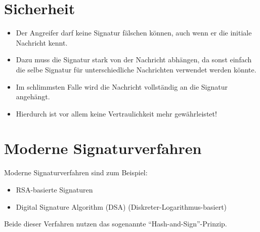     \section{Sicherheit}
        \begin{itemize}
        	\item Der Angreifer darf keine Signatur fälschen können, auch wenn er die initiale Nachricht kennt.
        	\item Dazu muss die Signatur stark von der Nachricht abhängen, da sonst einfach die selbe Signatur für unterschiedliche Nachrichten verwendet werden könnte.
        	\item Im schlimmsten Falle wird die Nachricht vollständig an die Signatur angehängt.
        	\item Hierdurch ist vor allem keine Vertraulichkeit mehr gewährleistet!
        \end{itemize}

    \section{Moderne Signaturverfahren}
        Moderne Signaturverfahren sind zum Beispiel:
        \begin{itemize}
        	\item RSA-basierte Signaturen
        	\item Digital Signature Algorithm (DSA) (Diskreter-Logarithmus-basiert)
        \end{itemize}
        Beide dieser Verfahren nutzen das sogenannte \enquote{Hash-and-Sign}-Prinzip.

